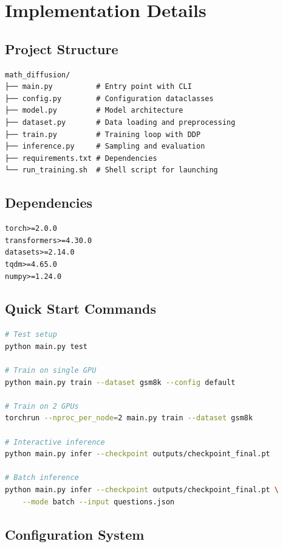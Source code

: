 \documentclass[11pt,a4paper]{article}
\begin{document}
\section{Implementation Details}

\subsection{Project Structure}

\begin{verbatim}
math_diffusion/
├── main.py          # Entry point with CLI
├── config.py        # Configuration dataclasses
├── model.py         # Model architecture
├── dataset.py       # Data loading and preprocessing
├── train.py         # Training loop with DDP
├── inference.py     # Sampling and evaluation
├── requirements.txt # Dependencies
└── run_training.sh  # Shell script for launching
\end{verbatim}

\subsection{Dependencies}

\begin{lstlisting}
torch>=2.0.0
transformers>=4.30.0
datasets>=2.14.0
tqdm>=4.65.0
numpy>=1.24.0
\end{lstlisting}

\subsection{Quick Start Commands}

\begin{lstlisting}[language=bash]
# Test setup
python main.py test

# Train on single GPU
python main.py train --dataset gsm8k --config default

# Train on 2 GPUs
torchrun --nproc_per_node=2 main.py train --dataset gsm8k

# Interactive inference
python main.py infer --checkpoint outputs/checkpoint_final.pt

# Batch inference
python main.py infer --checkpoint outputs/checkpoint_final.pt \
    --mode batch --input questions.json
\end{lstlisting}

\subsection{Configuration System}
\end{document}
